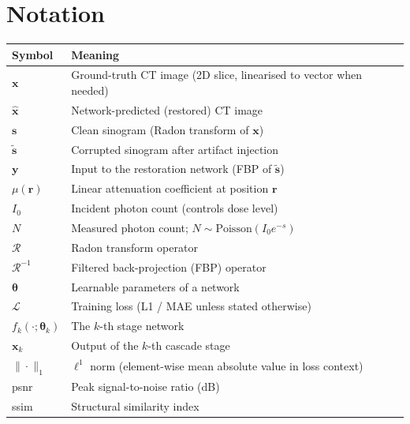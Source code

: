 
\chapter*{Notation}

\begin{tabular}{p{} p{}}
    \toprule
    \textbf{Symbol} & \textbf{Meaning} \\
    \midrule
    $\boldsymbol{x}$        & Ground-truth CT image (2D slice, linearised to vector when needed) \\
    $\boldsymbol{\hat{x}}$  & Network-predicted (restored) CT image \\
    $\boldsymbol{s}$        & Clean sinogram (Radon transform of $\boldsymbol{x}$) \\
    $\boldsymbol{\tilde{s}}$& Corrupted sinogram after artifact injection \\
    $\boldsymbol{y}$        & Input to the restoration network (FBP of $\boldsymbol{\tilde{s}}$) \\
    $\mu(\boldsymbol{r})$   & Linear attenuation coefficient at position $\boldsymbol{r}$ \\
    $I_0$                   & Incident photon count (controls dose level) \\
    $N$                     & Measured photon count; $N \sim \mathrm{Poisson}(I_0 e^{-s})$ \\
    $\mathcal{R}$           & Radon transform operator \\
    $\mathcal{R}^{-1}$      & Filtered back-projection (FBP) operator \\
    $\boldsymbol{\theta}$   & Learnable parameters of a network \\
    $\mathcal{L}$           & Training loss (L1 / MAE unless stated otherwise) \\
    $f_k(\cdot;\boldsymbol{\theta}_k)$ & The $k$-th stage network \\
    $\boldsymbol{x}_k$      & Output of the $k$-th cascade stage \\
    $\|\cdot\|_1$           & $\ell^1$ norm (element-wise mean absolute value in loss context) \\
    \gls{psnr}              & Peak signal-to-noise ratio (dB) \\
    \gls{ssim}              & Structural similarity index \\
    \bottomrule
\end{tabular}

